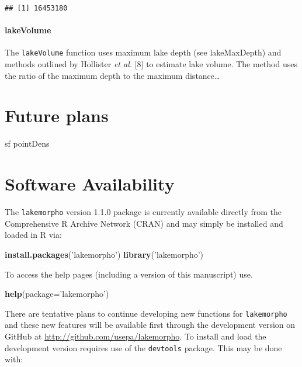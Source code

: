 \documentclass[11pt,]{article}
\newenvironment{Shaded}{\begin{snugshade}}{\end{snugshade}}
\newcommand{\KeywordTok}[1]{\textcolor[rgb]{0.13,0.29,0.53}{\textbf{{#1}}}}
\newcommand{\DataTypeTok}[1]{\textcolor[rgb]{0.13,0.29,0.53}{{#1}}}
\newcommand{\StringTok}[1]{\textcolor[rgb]{0.31,0.60,0.02}{{#1}}}
\newcommand{\NormalTok}[1]{{#1}}
\begin{document}
\begin{verbatim}
## [1] 16453180
\end{verbatim}

\paragraph{lakeVolume}\label{lakevolume}

The \texttt{lakeVolume} function uses maximum lake depth (see
lakeMaxDepth) and methods outlined by Hollister \emph{et al.} {[}8{]} to
estimate lake volume. The method uses the ratio of the maximum depth to
the maximum distance\ldots{}

\section{Future plans}\label{future-plans}

sf pointDens

\section{Software Availability}\label{software-availability}

The \texttt{lakemorpho} version 1.1.0 package is currently available
directly from the Comprehensive R Archive Network (CRAN) and may simply
be installed and loaded in R via:

\begin{Shaded}
\begin{Highlighting}[]
\KeywordTok{install.packages}\NormalTok{(}\StringTok{'lakemorpho'}\NormalTok{)}
\KeywordTok{library}\NormalTok{(}\StringTok{'lakemorpho'}\NormalTok{)}
\end{Highlighting}
\end{Shaded}

To access the help pages (including a version of this manuscript) use.

\begin{Shaded}
\begin{Highlighting}[]
\KeywordTok{help}\NormalTok{(}\DataTypeTok{package=}\StringTok{'lakemorpho'}\NormalTok{)}
\end{Highlighting}
\end{Shaded}

There are tentative plans to continue developing new functions for
\texttt{lakemorpho} and these new features will be available first
through the development version on GitHub at
\href{http://github.com/USEPA/lakemorpho}{http://github.com/usepa/lakemorpho}.
To install and load the development version requires use of the
\texttt{devtools} package. This may be done with:
\end{document}
